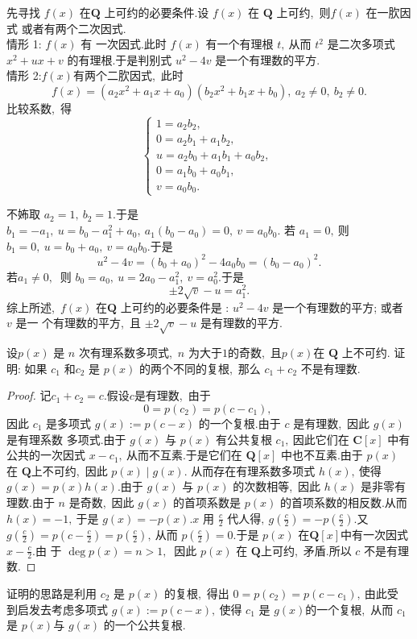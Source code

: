 \begin{solution}
	先寻找 $ f(x) $ 在$  \mathbf{Q}$  上可约的必要条件.设 $ f(x) $ 在 $ \mathbf{Q} $ 上可约,\ 则$  f(x) $ 在一肷因式 或者有两个二次因式.\\
	情形  1: $f(x) $ 有 一次因式.此时 $ f(x) $ 有一个有理根  $t ,\ $从而 $ t^{2}$  是二次多项式 $ x^{2}+u x+v $ 的有理根.于是判别式 $ u^{2}-4 v $ 是一个有理数的平方.\\
	情形  2:$ f(x)  $有两个二肷因式,\ 此时
	$$f(x)=\left(a_{2} x^{2}+a_{1} x+a_{0}\right)\left(b_{2} x^{2}+b_{1} x+b_{0}\right),\  a_{2} \neq 0,\  b_{2} \neq 0 .$$
	比较系数,\  得
	$$\left\{\begin{array}{l}
		1=a_{2} b_{2},\  \\
		0=a_{2} b_{1}+a_{1} b_{2},\  \\
		u=a_{2} b_{0}+a_{1} b_{1}+a_{0} b_{2},\  \\
		0=a_{1} b_{0}+a_{0} b_{1},\  \\
		v=a_{0} b_{0} .
	\end{array}\right.$$
	
	不㚴取 $ a_{2}=1,\  b_{2}=1  .$于是 $ b_{1}=-a_{1},\  u=b_{0}-a_{1}^{2}+a_{0},\  a_{1}\left(b_{0}-a_{0}\right)=0,\  v=a_{0} b_{0}  .$
	若 $ a_{1}=0 ,\  $则  $b_{1}=0,\  u=b_{0}+a_{0},\  v=a_{0} b_{0}  . $于是
	$$u^{2}-4 v=\left(b_{0}+a_{0}\right)^{2}-4 a_{0} b_{0}=\left(b_{0}-a_{0}\right)^{2} .$$
	若$  a_{1} \neq 0 ,\ $ 则 $ b_{0}=a_{0},\  u=2 a_{0}-a_{1}^{2},\  v=a_{0}^{2}  .$于是
	$$\pm 2 \sqrt{v}-u=a_{1}^{2}.$$
	综上所述,\  $ f(x)$  在$  \mathbf{Q}$  上可约的必要条件是 : $ u^{2}-4 v $ 是一个有理数的平方; 或者 $ v $ 是一 个有理数的平方,\  且 $ \pm 2 \sqrt{v}-u $ 是有理数的平方.
\end{solution}
\newpage
\begin{problem}
	设$  p(x)$  是 $ n $ 次有理系数多项式,\  $ n$  为大于$ 1 $的奇数,\  且$  p(x)  $在  $\mathbf{Q}$  上不可约. 证明: 如果 $ c_{1} $ 和$  c_{2} $ 是  $p(x) $ 的两个不同的复根,\  那么  $c_{1}+c_{2} $ 不是有理数.
\end{problem}
\begin{proof}
	记$c_1+c_2=c.$假设$c$是有理数,\ 由于
	$$0=p\left(c_{2}\right)=p\left(c-c_{1}\right),\ $$
	因此 $ c_{1} $ 是多项式 $ g(x):=p(c-x) $ 的一个复根.由于 $ c $ 是有理数,\  因此  $g(x)  $是有理系数 多项式.由于 $ g(x)$  与 $ p(x)$  有公共复根 $ c_{1} ,\  $因此它们在 $ \mathbf{C}[x] $ 中有公共的一次因式 $ x-c_{1} ,\  $从而不互素.于是它们在 $ \mathbf{Q}[x] $ 中也不互素.由于 $ p(x) $ 在 $ \mathbf{Q}  $上不可约,\  因此 $ p(x) \mid g(x)  .$ 从而存在有理系数多项式 $ h(x) ,\  $使得  $g(x)=p(x) h(x)  .$由于 $ g(x)$  与  $p(x)$  的次数相等,\  因此 $ h(x)$  是非零有理数.由于 $ n $ 是奇数,\  因此 $ g(x) $ 的首项系数是  $p(x)$ 的首项系数的相反数.从而 $ h(x)=-1 ,\  $于是 $ g(x)=-p(x)  .  x$  用 $ \frac{c}{2} $ 代人得$,\   g\left(\frac{c}{2}\right)=-p\left(\frac{c}{2}\right)  .$又 $ g\left(\frac{c}{2}\right)=p\left(c-\frac{c}{2}\right)=p\left(\frac{c}{2}\right) ,\  $从而 $ p\left(\frac{c}{2}\right)=0  .$于是  $p(x)$  在$  \mathbf{Q}[x]  $中有一次因式 $ x-\frac{c}{2}  .$由 于 $ \operatorname{deg} p(x)=n>1 ,\ $ 因此  $p(x) $ 在  $\mathbf{Q}  $上可约,\  矛盾.所以  $c $ 不是有理数.
\end{proof}
\begin{note}
	证明的思路是利用 $ c_{2} $ 是  $p(x)$  的复根,\  得出  $0=p\left(c_{2}\right)=p\left(c-c_{1}\right) ,\  $由此受 到启发去考虑多项式 $ g(x):=p(c-x) ,\  $使得 $ c_{1} $ 是 $ g(x)  $的一个复根,\  从而  $c_{1} $ 是 $ p(x)  $与  $g(x) $ 的一个公共复根.
\end{note}